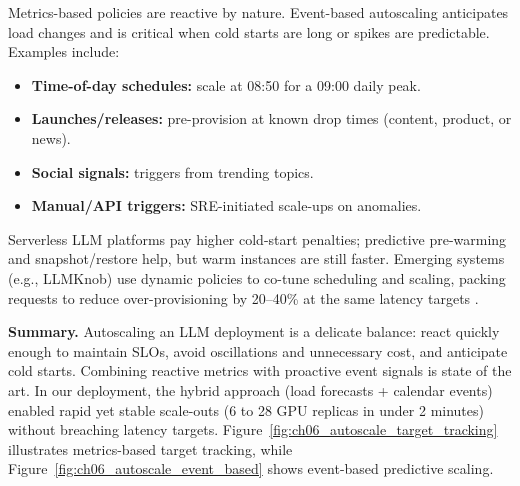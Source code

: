 \begin{tcolorbox}[
  title={\textbf{Event-Based Autoscaling: Operational Notes}},
  colback=orange!5,
  colframe=orange!40!black,
  colbacktitle=orange!20,
  coltitle=black,
  fonttitle=\bfseries,
  boxrule=0.7pt,
  arc=4pt,
  left=5mm, right=5mm, top=4mm, bottom=4mm,
  before skip=6pt,
  after skip=6pt
]
Metrics-based policies are reactive by nature. Event-based autoscaling anticipates load changes and is critical when cold starts are long or spikes are predictable. Examples include:

\begin{itemize}[leftmargin=1.5em, itemsep=4pt]
  \item \textbf{Time-of-day schedules:} scale at 08{:}50 for a 09{:}00 daily peak.
  
  \item \textbf{Launches/releases:} pre-provision at known drop times (content, product, or news).
  
  \item \textbf{Social signals:} triggers from trending topics.
  
  \item \textbf{Manual/API triggers:} SRE-initiated scale-ups on anomalies.
\end{itemize}

\medskip
Serverless LLM platforms pay higher cold-start penalties; predictive pre-warming and snapshot/restore help, but warm instances are still faster. Emerging systems (e.g., LLMKnob) use dynamic policies to co-tune scheduling and scaling, packing requests to reduce over-provisioning by 20--40\% at the same latency targets \cite{pope2023exegpt,helix2023}.
\end{tcolorbox}

\medskip
\noindent\textbf{Summary.} Autoscaling an LLM deployment is a delicate balance: react quickly enough to maintain SLOs, avoid oscillations and unnecessary cost, and anticipate cold starts. Combining reactive metrics with proactive event signals is state of the art. In our \ishtar{} deployment, the hybrid approach (load forecasts + calendar events) enabled rapid yet stable scale-outs (6 to 28 GPU replicas in under 2 minutes) without breaching latency targets. Figure~\ref{fig:ch06_autoscale_target_tracking} illustrates metrics-based target tracking, while Figure~\ref{fig:ch06_autoscale_event_based} shows event-based predictive scaling.

